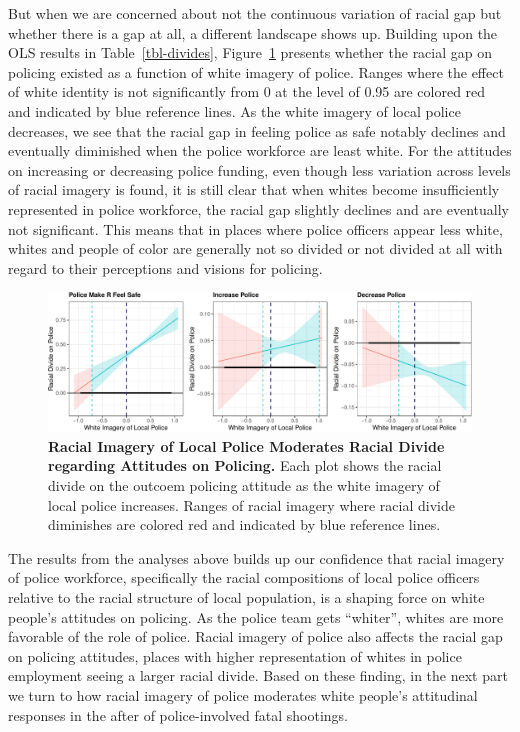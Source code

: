 \documentclass[
  12pt,
]{article}
\begin{document}
But when we are concerned about not the continuous variation of racial
gap but whether there is a gap at all, a different landscape shows up.
Building upon the OLS results in Table~\ref{tbl-divides},
Figure~\ref{fig-divides} presents whether the racial gap on policing
existed as a function of white imagery of police. Ranges where the
effect of white identity is not significantly from 0 at the level of
0.95 are colored red and indicated by blue reference lines. As the white
imagery of local police decreases, we see that the racial gap in feeling
police as safe notably declines and eventually diminished when the
police workforce are least white. For the attitudes on increasing or
decreasing police funding, even though less variation across levels of
racial imagery is found, it is still clear that when whites become
insufficiently represented in police workforce, the racial gap slightly
declines and are eventually not significant. This means that in places
where police officers appear less white, whites and people of color are
generally not so divided or not divided at all with regard to their
perceptions and visions for policing.

\begin{figure}[tb]

{\centering \includegraphics{quarto_files/figure-pdf/fig-divides-1.pdf}

}

\caption{\label{fig-divides}\textbf{Racial Imagery of Local Police
Moderates Racial Divide regarding Attitudes on Policing.} Each plot
shows the racial divide on the outcoem policing attitude as the white
imagery of local police increases. Ranges of racial imagery where racial
divide diminishes are colored red and indicated by blue reference
lines.}

\end{figure}

The results from the analyses above builds up our confidence that racial
imagery of police workforce, specifically the racial compositions of
local police officers relative to the racial structure of local
population, is a shaping force on white people's attitudes on policing.
As the police team gets ``whiter'', whites are more favorable of the
role of police. Racial imagery of police also affects the racial gap on
policing attitudes, places with higher representation of whites in
police employment seeing a larger racial divide. Based on these finding,
in the next part we turn to how racial imagery of police moderates white
people's attitudinal responses in the after of police-involved fatal
shootings.
\end{document}
